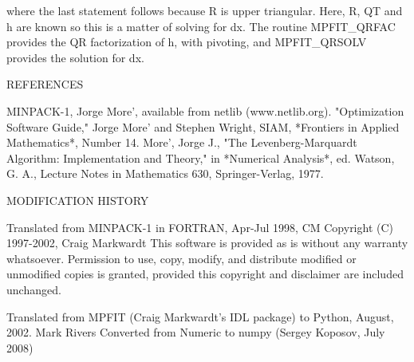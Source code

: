 \begin{DoxyVerb}
   where the last statement follows because R is upper triangular.
   Here, R, QT and h are known so this is a matter of solving for dx.
   The routine MPFIT_QRFAC provides the QR factorization of h, with
   pivoting, and MPFIT_QRSOLV provides the solution for dx.


                     REFERENCES

   MINPACK-1, Jorge More', available from netlib (www.netlib.org).
   "Optimization Software Guide," Jorge More' and Stephen Wright,
     SIAM, *Frontiers in Applied Mathematics*, Number 14.
   More', Jorge J., "The Levenberg-Marquardt Algorithm:
     Implementation and Theory," in *Numerical Analysis*, ed. Watson,
     G. A., Lecture Notes in Mathematics 630, Springer-Verlag, 1977.


               MODIFICATION HISTORY

   Translated from MINPACK-1 in FORTRAN, Apr-Jul 1998, CM
 Copyright (C) 1997-2002, Craig Markwardt
 This software is provided as is without any warranty whatsoever.
 Permission to use, copy, modify, and distribute modified or
 unmodified copies is granted, provided this copyright and disclaimer
 are included unchanged.

   Translated from MPFIT (Craig Markwardt's IDL package) to Python,
   August, 2002.  Mark Rivers
   Converted from Numeric to numpy (Sergey Koposov, July 2008)
\end{DoxyVerb}
 